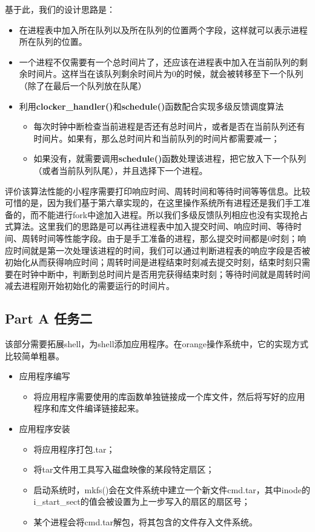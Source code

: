 \documentclass{whureport}
\begin{document}
基于此，我们的设计思路是：
\begin{itemize}
  \item 在进程表中加入所在队列以及所在队列的位置两个字段，这样就可以表示进程所在队列的位置。
  \item 一个进程不仅需要有一个总时间片了，还应该在进程表中加入在当前队列的剩余时间片。这样当在该队列剩余时间片为0的时候，就会被转移至下一个队列（除了在最后一个队列放在队尾）
  \item 利用\textbf{clocker\_handler()}和\textbf{schedule()}函数配合实现多级反馈调度算法
  \begin{itemize}
  \item 每次时钟中断检查当前进程是否还有总时间片，或者是否在当前队列还有时间片。如果有，那么总时间片和当前队列的时间片都需要减一；
  \item 如果没有，就需要调用\textbf{schedule()}函数处理该进程，把它放入下一个队列（或者当前队列队尾），并且选择下一个进程。
\end{itemize}
\end{itemize}

评价该算法性能的小程序需要打印响应时间、周转时间和等待时间等等信息。比较可惜的是，因为我们基于第六章实现的，在这里操作系统所有进程还是我们手工准备的，而不能进行fork中途加入进程。所以我们多级反馈队列相应也没有实现抢占式算法。这里我们的思路是可以再往进程表中加入提交时间、响应时间、等待时间、周转时间等性能字段。由于是手工准备的进程，那么提交时间都是0时刻；响应时间就是第一次处理该进程的时间，我们可以通过判断进程表的响应字段是否被初始化从而获得响应时间；周转时间是进程结束时刻减去提交时刻，结束时刻只需要在时钟中断中，判断到总时间片是否用完获得结束时刻；等待时间就是周转时间减去进程刚开始初始化的需要运行的时间片。

\subsection{Part A 任务二}
该部分需要拓展shell，为shell添加应用程序。在orange操作系统中，它的实现方式比较简单粗暴。
\begin{itemize}
  \item 应用程序编写
  \begin{itemize}
  \item 将应用程序需要使用的库函数单独链接成一个库文件，然后将写好的应用程序和库文件编译链接起来。
\end{itemize}

  \item 应用程序安装
  \begin{itemize}
  \item 将应用程序打包.tar；
  \item 将tar文件用工具写入磁盘映像的某段特定扇区；
  \item 启动系统时，mkfs()会在文件系统中建立一个新文件cmd.tar，其中inode的i\_start\_sect的值会被设置为上一步写入的扇区的扇区号；
  \item 某个进程会将cmd.tar解包，将其包含的文件存入文件系统。
\end{itemize}

\end{itemize}
\end{document}
